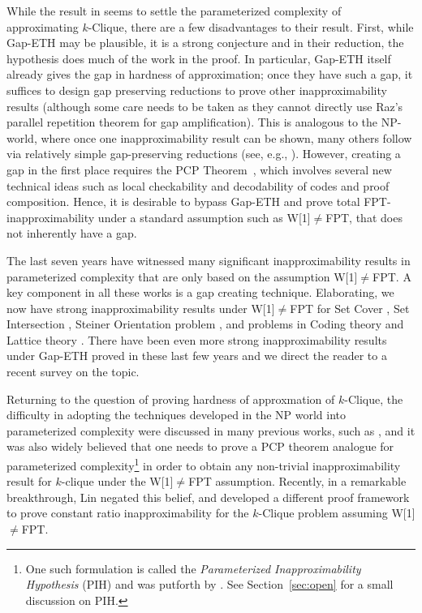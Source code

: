\documentclass[10pt,a4paper]{article}
\begin{document}
While the result in \cite{CCKLMNT20}  seems to settle the parameterized complexity of approximating $k$-Clique, there are a few disadvantages to their result. First, while Gap-ETH may be plausible, it is a strong conjecture and in their reduction, the hypothesis does much of the work in the proof. In particular, Gap-ETH itself already gives the gap in hardness of approximation; once they have  such a gap, it suffices to design gap preserving reductions to prove other inapproximability results (although some care needs to be taken as they cannot directly use Raz's parallel repetition theorem \cite{R98} for gap amplification). This is analogous to the NP-world, where once one inapproximability result can be shown, many others follow via relatively simple gap-preserving reductions (see, e.g., \cite{PY91}). However, creating a gap in the first place requires the PCP Theorem~\cite{AS98,ALMSS98,D07}, which involves several new technical ideas such as local checkability and decodability of codes and proof composition. Hence, it is desirable to bypass Gap-ETH and prove total FPT-inapproximability under a standard assumption such as W[1]$\neq$FPT, that does not inherently have a gap.

The last seven years have witnessed many significant inapproximability results in parameterized complexity that are only based on the assumption  W[1]$\neq$FPT. A key component in all these works is a gap creating technique. Elaborating, we now have strong inapproximability results under W[1]$\neq$FPT for 
Set Cover \cite{CL19,KLM19,L19,KN21}, Set Intersection \cite{L18,BKN21},
Steiner Orientation problem \cite{W20}, and problems in Coding theory and Lattice theory \cite{BBEGKLMM21}. There have been even more   strong inapproximability results under Gap-ETH proved in these last few years and we direct the reader to a recent survey \cite{FKLM20} on the topic. 











Returning to the question of proving hardness of approxmation of $k$-Clique, the difficulty in adopting the  techniques developed in the NP world into parameterized complexity 	were discussed in many previous works, such as \cite{CGG06,L18,CL19, FKLM20}, and it was also widely believed \cite{CGG06} that one needs to prove a PCP theorem analogue for parameterized complexity\footnote{One such formulation is called the \emph{Parameterized Inapproximability Hypothesis} (PIH) and was putforth by \cite{LRSZ20}. See Section~\ref{sec:open} for a small discussion on PIH. } in order to obtain any non-trivial inapproximability result for $k$-clique under the W[1]$\neq$FPT assumption. Recently, in a remarkable breakthrough, Lin \cite{L21} negated this belief, and developed a different proof framework to prove constant ratio inapproximability for the $k$-Clique problem assuming W[1]$\neq$FPT. 
\end{document}
